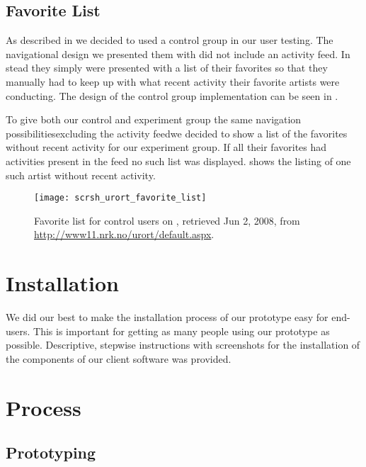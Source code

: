 \subsection{Favorite List}
\label{section:implementation.design.favorite.list}

As described in
we decided to used a control group in our user testing. The navigational
design we presented them with did not include an activity feed. In stead they
simply were presented with a list of their favorites so that they manually had
to keep up with what recent activity their favorite artists were conducting.
The design of the control group implementation can be seen in
.

To give both our control and experiment group the same navigation
possibilities\dash{}excluding the activity feed\dash{}we decided to show a
list of the favorites without recent activity for our experiment group. If all
their favorites had activities present in the feed no such list was displayed.
 shows the listing of one such artist
without recent activity.

\begin{figure}
  \centering
  \texttt{[image: scrsh\_urort\_favorite\_list]}
  \caption[\urort{} Favorite List]{
    Favorite list for control users on \urort{},
    retrieved Jun 2, 2008, from
    \url{http://www11.nrk.no/urort/default.aspx}.
  }
  \label{figure:scrsh.urort.favorite.list}
\end{figure}

\section{Installation}

We did our best to make the installation process of our prototype easy
for end-users. This is important for getting as many people using our
prototype as possible.
Descriptive, stepwise instructions with screenshots for the installation of
the components of our client software was provided.

\section{Process}

\subsection{Prototyping}

